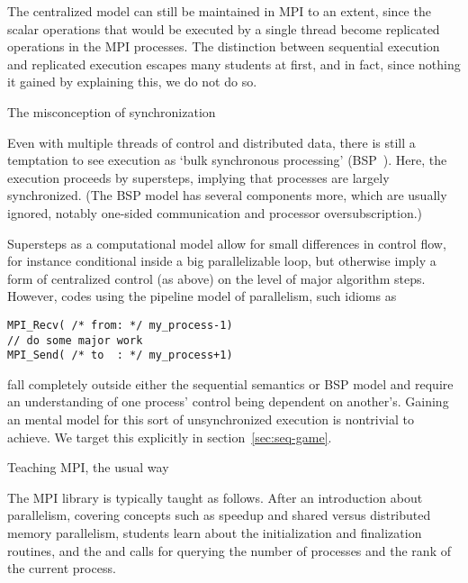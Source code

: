 \begin{comment}
  The combination of single thread of control, but distributed data, we
  identified above as `sequential
  semantics'~\cite{Nikhil:ph-book}. While this is a feasible model for
  parallel execution, it leads to idioms such as 
\begin{verbatim}
for (p=0; p<nprocs; p++)
  if (p==myrank)
    // do some function of p
\end{verbatim}
when the code needs to distinguish between processes.
\end{comment}

The centralized model can still be maintained in MPI to an extent, since
the scalar operations that would be executed by a single thread
become replicated operations in the MPI processes.
The distinction between sequential execution and
replicated execution escapes many students at first, and in fact,
since nothing it gained by explaining this, we do not do so.

 {The misconception of synchronization}

Even with multiple threads of control and distributed data, there is
still a temptation to see execution as `bulk
synchronous processing' (BSP~\cite{Valiant:1990:BSP}).
Here, the execution proceeds by supersteps, implying that processes
are largely synchronized. (The BSP model has several components more,
which are usually ignored, notably one-sided communication and processor
oversubscription.)

Supersteps as a computational model allow for small
differences in control flow, for instance conditional inside a big
parallelizable loop, but otherwise imply a form of centralized control
(as above) on the level of major algorithm steps.
However, codes  using the pipeline model of parallelism, such idioms as
\begin{verbatim}
MPI_Recv( /* from: */ my_process-1)
// do some major work
MPI_Send( /* to  : */ my_process+1)
\end{verbatim}
fall completely outside either the sequential semantics or BSP model
and require an understanding of one process' control being dependent
on another's.
%
Gaining an mental model for this sort of unsynchronized execution is
nontrivial to achieve. We target this explicitly in
section~\ref{sec:seq-game}.

 {Teaching MPI, the usual way}
\label{sec:mpi-usual}

The \ac{MPI} library is typically taught as follows.  After an
introduction about parallelism, covering concepts such as speedup
and shared versus distributed memory parallelism, students learn about
the initialization and finalization routines, and the
 and  calls for querying the number
of processes and the rank of the current process.

